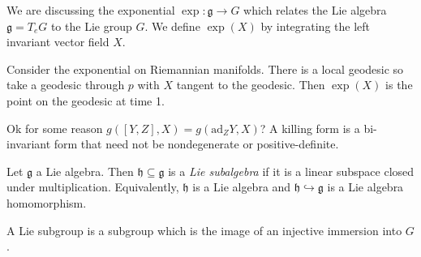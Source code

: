 
We are discussing the exponential $\exp : \mathfrak{g}  \to G$ which relates the Lie algebra $\mathfrak{g} =T_eG$ to the Lie group $G$. We define $\exp (X)$ by integrating the left invariant vector field $X$.

Consider the exponential on Riemannian manifolds. There is a local geodesic so take a geodesic through $p$ with $X$ tangent to the geodesic. Then $\exp (X)$ is the point on the geodesic at time 1.

Ok for some reason $g([Y,Z],X)=g(\mathrm{ad} _ZY,X)$? A killing form is a bi-invariant form that need not be nondegenerate or positive-definite.

\begin{definition}\label{1.2.8}
	Let $\mathfrak{g} $ a Lie algebra. Then $\mathfrak{h} \subseteq \mathfrak{g} $ is a \emph{Lie subalgebra} if it is a linear subspace closed under multiplication. Equivalently, $\mathfrak{h} $ is a Lie algebra and $\mathfrak{h} \hookrightarrow \mathfrak{g} $ is a Lie algebra homomorphism.
\end{definition}
\begin{definition}\label{1.2.9}
	A Lie subgroup is a subgroup which is the image of an injective immersion into $G$.
\end{definition}

